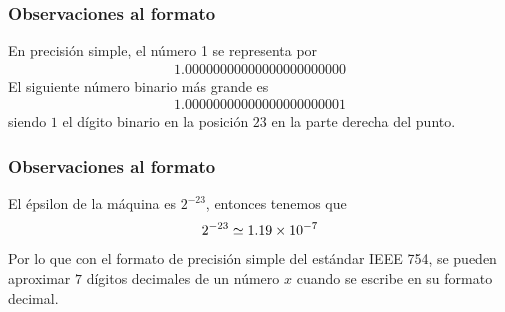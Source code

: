 \begin{frame}
\frametitle{Observaciones al formato}
En precisión simple, el número 1 se representa por
\begin{align*}
1.00000000000000000000000
\end{align*}
\pause
El siguiente número binario más grande es
\begin{align*}
1.00000000000000000000001
\end{align*}
siendo $1$ el dígito binario en la posición $23$ en la parte derecha del punto.
\end{frame}
\begin{frame}
\frametitle{Observaciones al formato}
El épsilon de la máquina es $2^{-23}$, entonces tenemos que
\begin{align*}
2^{-23} \simeq \num{1.19d-7}
\end{align*}
\pause
Por lo que con el formato de precisión simple del estándar IEEE 754, se pueden aproximar $7$ dígitos decimales de un número $x$ cuando se escribe en su formato decimal.
\end{frame}
